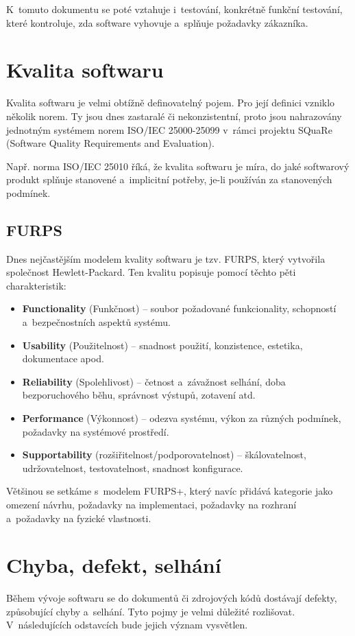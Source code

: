 	K~tomuto dokumentu se poté vztahuje i~testování, konkrétně funkční testování, které kontroluje, zda software vyhovuje a~splňuje požadavky zákazníka.
	
	\section{Kvalita softwaru}
	Kvalita softwaru je velmi obtížně definovatelný pojem. Pro její definici vzniklo několik norem. Ty jsou dnes zastaralé či nekonzistentní, proto jsou nahrazovány jednotným systémem norem ISO/IEC 25000-25099 v~rámci projektu SQuaRe (Software Quality Requirements and Evaluation).
	
	Např. norma ISO/IEC 25010 říká, že kvalita softwaru je míra, do jaké softwarový produkt splňuje stanovené a~implicitní potřeby, je-li používán za stanovených podmínek.
	
		\subsection{FURPS}
		Dnes nejčastějším modelem kvality softwaru je tzv. FURPS, který vytvořila společnost Hewlett-Packard. Ten kvalitu popisuje pomocí těchto pěti charakteristik:
			\begin{itemize}
				\item \textbf{Functionality} (Funkčnost) -- soubor požadované funkcionality, schopností a~bezpečnostních aspektů systému.
				\item \textbf{Usability} (Použitelnost) -- snadnost použití, konzistence, estetika, dokumentace apod.
				\item \textbf{Reliability} (Spolehlivost) -- četnost a~závažnost selhání, doba bezporuchového běhu, správnost výstupů, zotavení atd.
				\item \textbf{Performance} (Výkonnost) -- odezva systému, výkon za různých podmínek, požadavky na systémové prostředí.
				\item \textbf{Supportability} (rozšiřitelnost/podporovatelnost) -- škálovatelnost, udržovatelnost, testovatelnost, snadnost konfigurace.
			\end{itemize}
		Většinou se setkáme s~modelem FURPS+, který navíc přidává kategorie jako omezení návrhu, požadavky na implementaci, požadavky na rozhraní a~požadavky na fyzické vlastnosti.
			
	\section{Chyba, defekt, selhání}
	Během vývoje softwaru se do dokumentů či zdrojových kódů dostávají defekty, způsobující chyby a~selhání. Tyto pojmy je velmi důležité rozlišovat. V~následujících odstavcích bude jejich význam vysvětlen.
	
